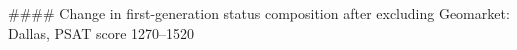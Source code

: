 #### Change in first-generation status composition after excluding Geomarket: Dallas, PSAT score 1270–1520
